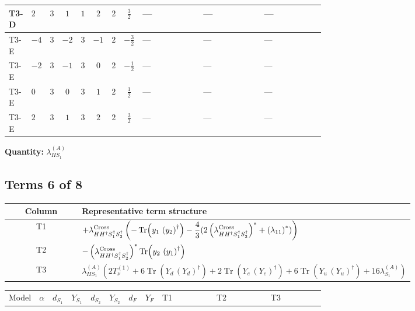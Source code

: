 \documentclass[8pt]{article}
\begin{document}
\begin{landscape}
\begin{longtable}{@{}llcccccc >{\raggedright\arraybackslash}p{0.21\linewidth} >{\raggedright\arraybackslash}p{0.21\linewidth} >{\raggedright\arraybackslash}p{0.21\linewidth}@{}}
\midrule
T3-D & $2$ & $3$ & $1$ & $1$ & $2$ & $2$ & $\frac{3}{2}$ & --- & --- & --- \\
\midrule
T3-E & $-4$ & $3$ & $-2$ & $3$ & $-1$ & $2$ & $-\frac{3}{2}$ & --- & --- & --- \\
\midrule
T3-E & $-2$ & $3$ & $-1$ & $3$ & $0$ & $2$ & $-\frac{1}{2}$ & --- & --- & --- \\
\midrule
T3-E & $0$ & $3$ & $0$ & $3$ & $1$ & $2$ & $\frac{1}{2}$ & --- & --- & --- \\
\midrule
T3-E & $2$ & $3$ & $1$ & $3$ & $2$ & $2$ & $\frac{3}{2}$ & --- & --- & --- \\
\midrule
\bottomrule
\end{longtable}
\clearpage
\noindent\textbf{Quantity: }$\lambda_{HS_1}^{(A)}$\par\smallskip
\subsection*{Terms 6 of 8}
\begin{center}
\begin{tabular}{@{}c >{\raggedright\arraybackslash}p{0.82\linewidth}@{}}
\toprule
Column & Representative term structure \\
\midrule
T1 & \(\displaystyle +{\lambda_{H H^\dagger S_1^\dagger S_2^\dagger}^{\rm Cross}} \left(-\operatorname{Tr}\!\left({y_1}\,\left({y_2}\right)^{\dagger}\right)-\frac{4}{3} (2 \left({\lambda_{H H^\dagger S_1^\dagger S_2^\dagger}^{\rm Cross}}\right)^{*}+\left({\lambda_{11}}\right)^{*})\right)\) \\
\midrule
T2 & \(\displaystyle -\left({\lambda_{H H^\dagger S_1^\dagger S_2^\dagger}^{\rm Cross}}\right)^{*} \operatorname{Tr}\!\left({y_2}\,\left({y_1}\right)^{\dagger}\right)\) \\
\midrule
T3 & \(\displaystyle {\lambda_{HS_1}^{(A)}} (2 T_{\nu}^{(1)}+6 \operatorname{Tr}\!\left({Y_d}\,\left({Y_d}\right)^{\dagger}\right)+2 \operatorname{Tr}\!\left({Y_e}\,\left({Y_e}\right)^{\dagger}\right)+6 \operatorname{Tr}\!\left({Y_u}\,\left({Y_u}\right)^{\dagger}\right)+16 {\lambda_{S_1}^{(A)}})\) \\
\midrule
\bottomrule
\end{tabular}
\end{center}
\smallskip
\tiny
\begin{longtable}{@{}llcccccc >{\raggedright\arraybackslash}p{0.21\linewidth} >{\raggedright\arraybackslash}p{0.21\linewidth} >{\raggedright\arraybackslash}p{0.21\linewidth}@{}}
\toprule
Model & $\alpha$ & $d_{S_1}$ & $Y_{S_1}$ & $d_{S_2}$ & $Y_{S_2}$ & $d_F$ & $Y_F$ & T1 & T2 & T3 \\

\end{longtable}
\end{landscape}
\end{document}
